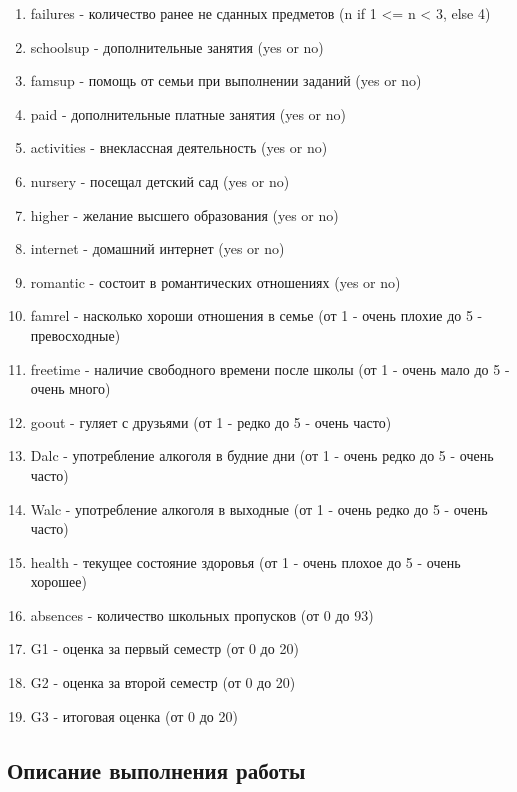 \documentclass[a4paper]{article}
\begin{document}
{\begin{enumerate}
        \item failures - количество ранее не сданных предметов (n if 1 <= n < 3, else 4)
        \item schoolsup - дополнительные занятия (yes or no)
        \item famsup - помощь от семьи при выполнении заданий (yes or no)
        \item paid - дополнительные платные занятия (yes or no)
        \item activities - внеклассная деятельность (yes or no)
        \item nursery - посещал детский сад (yes or no)
        \item higher - желание высшего образования (yes or no)
        \item internet - домашний интернет (yes or no)
        \item romantic - состоит в романтических отношениях (yes or no)
        \item famrel - насколько хороши отношения в семье (от 1 - очень плохие до 5 - превосходные)
        \item freetime - наличие свободного времени после школы (от 1 - очень мало до 5 - очень много)
        \item goout - гуляет с друзьями (от 1 - редко до 5 - очень часто)
        \item Dalc - употребление алкоголя в будние дни (от 1 - очень редко до 5 - очень часто)
        \item Walc - употребление алкоголя в выходные (от 1 - очень редко до 5 - очень часто)
        \item health - текущее состояние здоровья (от 1 - очень плохое до 5 - очень хорошее)
        \item absences - количество школьных пропусков (от 0 до 93)
        \item G1 - оценка за первый семестр (от 0 до 20)
        \item G2 - оценка за второй семестр (от 0 до 20)
        \item G3 - итоговая оценка (от 0 до 20)
    \end{enumerate}
}


\newpage
\begin{center}
\hfill \break
\section{Описание выполнения работы}
\end{center}
\end{document}
